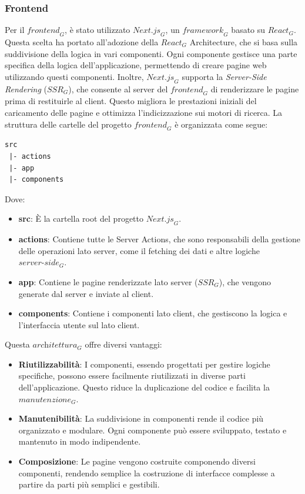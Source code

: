 \subsubsection{Frontend}
Per il $\textit{frontend}_G$, è stato utilizzato $\textit{Next.js}_G$, un $\textit{framework}_G$ basato su $\textit{React}_G$. Questa scelta ha portato all'adozione della $\textit{React}_G$ Architecture, che si basa sulla suddivisione della logica in vari componenti. Ogni componente gestisce una parte specifica della logica dell'applicazione, permettendo di creare pagine web utilizzando questi componenti.
Inoltre, $\textit{Next.js}_G$ supporta la \textit{Server-Side Rendering} ($\textit{SSR}_G$), che consente al server del $\textit{frontend}_G$ di renderizzare le pagine prima di restituirle al client. Questo migliora le prestazioni iniziali del caricamento delle pagine e ottimizza l'indicizzazione sui motori di ricerca.
La struttura delle cartelle del progetto $\textit{frontend}_G$ è organizzata come segue:
\begin{verbatim}
src
 |- actions
 |- app
 |- components
\end{verbatim}
Dove:
\begin{itemize}
\item \textbf{src}: È la cartella root del progetto $\textit{Next.js}_G$.
\item \textbf{actions}: Contiene tutte le Server Actions, che sono responsabili della gestione delle operazioni lato server, come il fetching dei dati e altre logiche $\textit{server-side}_G$.
\item \textbf{app}: Contiene le pagine renderizzate lato server ($\textit{SSR}_G$), che vengono generate dal server e inviate al client.
\item \textbf{components}: Contiene i componenti lato client, che gestiscono la logica e l'interfaccia utente sul lato client.
\end{itemize}
Questa $\textit{architettura}_G$ offre diversi vantaggi:
\begin{itemize}
\item \textbf{Riutilizzabilità}: I componenti, essendo progettati per gestire logiche specifiche, possono essere facilmente riutilizzati in diverse parti dell'applicazione. Questo riduce la duplicazione del codice e facilita la $\textit{manutenzione}_G$.
\item \textbf{Manutenibilità}: La suddivisione in componenti rende il codice più organizzato e modulare. Ogni componente può essere sviluppato, testato e mantenuto in modo indipendente.
\item \textbf{Composizione}: Le pagine vengono costruite componendo diversi componenti, rendendo semplice la costruzione di interfacce complesse a partire da parti più semplici e gestibili.
\end{itemize}
